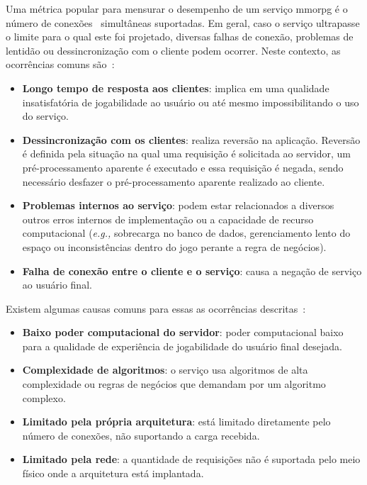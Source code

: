 Uma métrica popular para mensurar o desempenho de um serviço \ac{mmorpg} é o número de conexões~\cite{1417630} simultâneas suportadas.
%
Em geral, caso o serviço ultrapasse o limite para o qual este foi projetado, diversas falhas de conexão, problemas de lentidão ou dessincronização com o cliente podem ocorrer.
%
Neste contexto, as ocorrências comuns são~\cite{1417630}:

\begin{itemize}
  \item \textbf{Longo tempo de resposta aos clientes}: implica em uma qualidade insatisfatória de jogabilidade ao usuário ou até mesmo impossibilitando o uso do serviço.
  \item \textbf{Dessincronização com os clientes}: realiza reversão na aplicação. Reversão é definida pela situação na qual uma requisição é solicitada ao servidor, um pré-processamento aparente é executado e essa requisição é negada, sendo necessário desfazer o pré-processamento aparente realizado ao cliente.
  \item \textbf{Problemas internos ao serviço}:  podem estar relacionados a diversos outros erros internos de implementação ou a capacidade de recurso computacional (\textit{e.g.,} sobrecarga no banco de dados, gerenciamento lento do espaço ou inconsistências dentro do jogo perante a regra de negócios).
  \item \textbf{Falha de conexão entre o cliente e o serviço}: causa a negação de serviço ao usuário final.
\end{itemize}

Existem algumas causas comuns para essas as ocorrências descritas~\cite{1417630}:

\begin{itemize}
  \item \textbf{Baixo poder computacional do servidor}: poder computacional baixo para a qualidade de experiência de jogabilidade do usuário final desejada.
  \item \textbf{Complexidade de algoritmos}: o serviço usa algoritmos de alta complexidade ou regras de negócios que demandam por um algoritmo complexo.
  \item \textbf{Limitado pela própria arquitetura}: está limitado diretamente pelo número de conexões, não suportando a carga recebida.
  \item \textbf{Limitado pela rede}: a quantidade de requisições não é suportada pelo meio físico onde a arquitetura está implantada.
\end{itemize}

